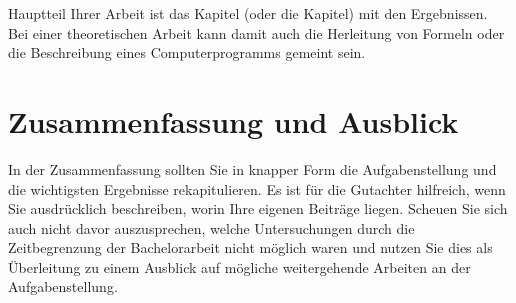 \documentclass[a4paper,11pt,oneside,final,german,openbib,pdftex]{scrbook}
\begin{document}
Hauptteil Ihrer Arbeit ist das Kapitel (oder die Kapitel) mit den 
Ergebnissen. Bei einer theoretischen Arbeit kann damit auch 
die Herleitung von Formeln oder die Beschreibung eines Computerprogramms 
gemeint sein.

\chapter{Zusammenfassung und Ausblick}

In der Zusammenfassung sollten Sie in knapper Form die Aufgabenstellung 
und die wichtigsten Ergebnisse rekapitulieren. Es ist f\"ur die 
Gutachter hilfreich, wenn Sie ausdr\"ucklich beschreiben, worin 
Ihre eigenen Beitr\"age liegen. Scheuen Sie sich auch nicht davor 
auszusprechen, welche Untersuchungen durch die Zeitbegrenzung der 
Bachelorarbeit nicht m\"oglich waren und nutzen Sie dies als 
\"Uberleitung zu einem Ausblick auf m\"ogliche weitergehende 
Arbeiten an der Aufgabenstellung.
\end{document}
